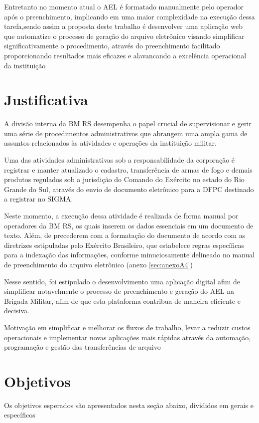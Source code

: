 Entretanto no momento atual o AEL é formatado manualmente pelo operador após o preenchimento, implicando em uma maior complexidade na execução dessa tarefa,sendo assim a proposta deste trabalho é desenvolver uma aplicação web que automatize o processo de geração do arquivo eletrônico visando simplificar significativamente o procedimento, através do preenchimento facilitado proporcionando resultados mais eficazes e alavancando a excelência operacional da instituição


\section{Justificativa}

A divisão interna da BM RS desempenha o papel crucial de supervisionar e gerir uma série de procedimentos administrativos que abrangem uma ampla gama de assuntos relacionados às atividades e operações da instituição militar. \cite{bmDepartamentoAdministrativo}

Uma das atividades administrativas sob a responsabilidade da corporação é registrar e manter atualizado o cadastro, transferência de armas de fogo e demais produtos regulados sob a jurisdição do Comando do Exército no estado do Rio Grande do Sul, através do envio de documento eletrônico para a DFPC destinado a registrar no SIGMA.\cite{ExércitoBrasileiro}

Neste momento, a execução dessa atividade é realizada de forma manual por operadores da BM RS, os quais inserem os dados essenciais em um documento de texto. Além, de precederem com a formatação do documento de acordo com as diretrizes estipuladas pelo Exército Brasileiro, que estabelece regras específicas para a indexação das informações, conforme minuciosamente delineado no manual de preenchimento do arquivo eletrônico (anexo \ref{sec:anexoA4})   

Nesse sentido, foi estipulado o desenvolvimento uma aplicação digital afim de simplificar notavelmente o processo de preenchimento e geração do AEL na Brigada Militar, afim de que esta plataforma contribua de maneira eficiente e decisiva.
\begin{citacao}
    Motivação em simplificar e melhorar os fluxos de trabalho, levar a reduzir custos operacionais e implementar novas aplicações mais rápidas através da automação, programação e gestão das transferências de arquivo\cite{AndradeJunior}
    \end{citacao}

\section{Objetivos}
Os objetivos esperados são apresentados nesta seção abaixo, divididos em gerais e específicos 

